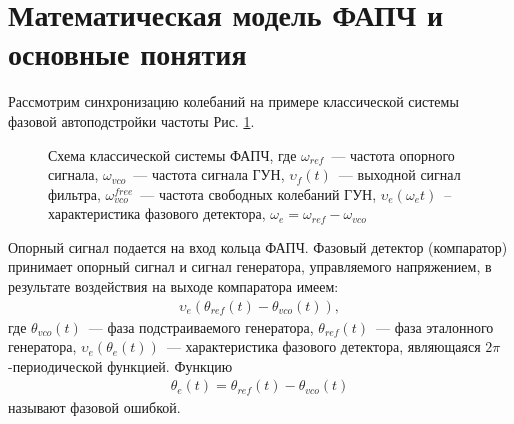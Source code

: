 \documentclass[a4paper,article,14pt]{extarticle}
\begin{document}

\newpage
\section{Математическая модель ФАПЧ и основные понятия}
Рассмотрим синхронизацию колебаний на примере классической системы фазовой автоподстройки частоты Рис. \ref{PLL-img}.
\begin{figure}[H]
\begin{center}
\end{center}
\caption{Схема классической системы ФАПЧ, где $\omega_{ref}$~--- частота опорного сигнала, $\omega_{vco}$~--- частота сигнала ГУН, $\upsilon_f(t)$~--- выходной сигнал фильтра, $\omega_{vco}^{free}$~--- частота свободных колебаний ГУН, $\upsilon_e(\omega_{e}t)$~-- характеристика фазового детектора, $\omega_e = \omega_{ref}-\omega_{vco}$ \label{PLL-img}}
\end{figure}

Опорный сигнал подается на вход кольца ФАПЧ. Фазовый детектор (компаратор) принимает опорный сигнал и сигнал генератора, управляемого напряжением, в результате воздействия на выходе компаратора имеем:
 \begin{equation*}
 \begin{aligned}
\upsilon_e(\theta_{ref}(t) - \theta_{vco}(t)),
 \end{aligned}
\end{equation*}
где $\theta_{vco}(t)$~--- фаза подстраиваемого генератора, $\theta_{ref}(t)$~--- фаза эталонного генератора, $\upsilon_e(\theta_e(t))$~--- характеристика фазового детектора, являющаяся $2\pi$-периодической функцией. Функцию
 \begin{equation}\label{phase_error}
 \begin{aligned}
\theta_e(t) = \theta_{ref}(t) - \theta_{vco}(t)
 \end{aligned}
\end{equation}
называют фазовой ошибкой.
\end{document}

